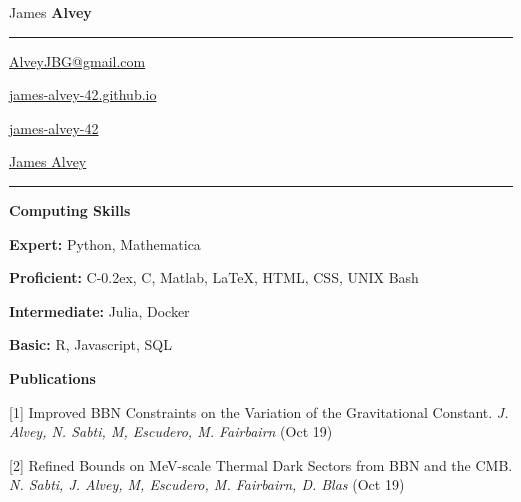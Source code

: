 \documentclass[10pt]{article}
\newcommand*\cpp{C\kern-0.2ex\raisebox{0.4ex}{\scalebox{0.8}{+\kern-0.4ex+}}}
\begin{document}
\AddToShipoutPictureBG*{%
  \AtPageLowerLeft{%
    \color{backgroundcol}%
    \rule{.33\paperwidth}{\paperheight}%
  }%
}%
\begin{minipage}[t]{0.25\linewidth}
{\Large James {\color{sidebarcol}\textbf{Alvey}}}
\vspace{0.2cm}

\hrule

\vspace{0.2cm}

\href{mailto:AlveyJBG@gmail.com}{{\color{iconcolor}\faEnvelope} \hspace{2pt} AlveyJBG@gmail.com}
\vspace{0.05cm}

\href{https://james-alvey-42.github.io}{{\color{iconcolor}\faGlobe} \hspace{2pt} james-alvey-42.github.io}
\vspace{0.05cm}

\href{https://github.com/james-alvey-42}{{\color{iconcolor}\faGithub} \hspace{2pt} james-alvey-42}
\vspace{0.05cm}

\href{https://www.linkedin.com/in/james-alvey-a75845102/}{{\color{iconcolor}\faLinkedin} \hspace{2pt} James Alvey}
\vspace{0.25cm}

\hrule

\vspace{0.25cm}


{\large {\color{sidebarcol}\textbf{Computing Skills}}}
\vspace{0.3cm}

\textbf{Expert:} Python, Mathematica

\textbf{Proficient:} \cpp, C, Matlab, \LaTeX, HTML, CSS, UNIX Bash

\textbf{Intermediate:} Julia, Docker

\textbf{Basic:} R, Javascript, SQL
\vspace{0.5cm}

{\large {\color{sidebarcol}\textbf{Publications}}}
\vspace{0.3cm}

{\small

[1] Improved BBN Constraints on the Variation of the Gravitational Constant. \textit{J. Alvey, N. Sabti, M, Escudero, M. Fairbairn} (Oct 19)
\vspace{0.05cm}

[2] Refined Bounds on MeV-scale Thermal Dark Sectors from BBN and the CMB. \textit{N. Sabti, J. Alvey, M, Escudero, M. Fairbairn, D. Blas} (Oct 19)
\vspace{0.05cm}

}
\end{minipage}
\end{document}
